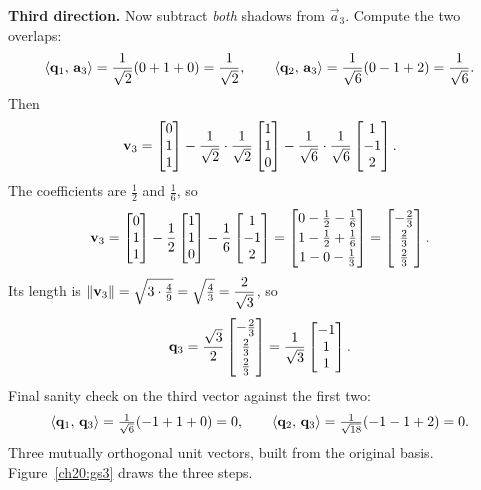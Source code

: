 \textbf{Third direction.} Now subtract \emph{both} shadows from $\vec{a}_3$. Compute
the two overlaps:
\[
  \langle \mathbf{q}_1,\, \mathbf{a}_3 \rangle=\frac{1}{\sqrt2}(0+1+0)=\frac{1}{\sqrt2},
  \qquad
  \langle \mathbf{q}_2,\, \mathbf{a}_3 \rangle=\frac{1}{\sqrt6}(0-1+2)=\frac{1}{\sqrt6}.
\]
Then
\[
  \mathbf{v}_3
   = \begin{bmatrix}0\\1\\1\end{bmatrix}
     - \frac{1}{\sqrt2}\cdot\frac{1}{\sqrt2}\begin{bmatrix}1\\1\\0\end{bmatrix}
     - \frac{1}{\sqrt6}\cdot\frac{1}{\sqrt6}\begin{bmatrix}1\\-1\\2\end{bmatrix}.
\]
The coefficients are $\tfrac12$ and $\tfrac16$, so
\[
  \mathbf{v}_3
   = \begin{bmatrix}0\\1\\1\end{bmatrix}
     - \frac12\begin{bmatrix}1\\1\\0\end{bmatrix}
     - \frac16\begin{bmatrix}1\\-1\\2\end{bmatrix}
   = \begin{bmatrix}0-\tfrac12-\tfrac16 \\[2pt] 1-\tfrac12+\tfrac16 \\[2pt] 1-0-\tfrac13\end{bmatrix}
   = \begin{bmatrix}-\tfrac23\\[2pt]\tfrac23\\[2pt]\tfrac23\end{bmatrix}.
\]
Its length is $\lVert\mathbf{v}_3\rVert=\sqrt{3\cdot\tfrac49}=\sqrt{\tfrac43}=\dfrac{2}{\sqrt3}$, so
\[
  \mathbf{q}_3 = \frac{\sqrt3}{2}\begin{bmatrix}-\tfrac23\\[2pt]\tfrac23\\[2pt]\tfrac23\end{bmatrix}
            = \frac{1}{\sqrt3}\begin{bmatrix}-1\\1\\1\end{bmatrix}.
\]
Final sanity check on the third vector against the first two:
\[
  \langle \mathbf{q}_1,\, \mathbf{q}_3 \rangle=\tfrac{1}{\sqrt6}(-1+1+0)=0,
  \qquad
  \langle \mathbf{q}_2,\, \mathbf{q}_3 \rangle=\tfrac{1}{\sqrt{18}}(-1-1+2)=0.
\]
Three mutually orthogonal unit vectors, built from the original basis.
Figure~\ref{ch20:gs3} draws the three steps.

